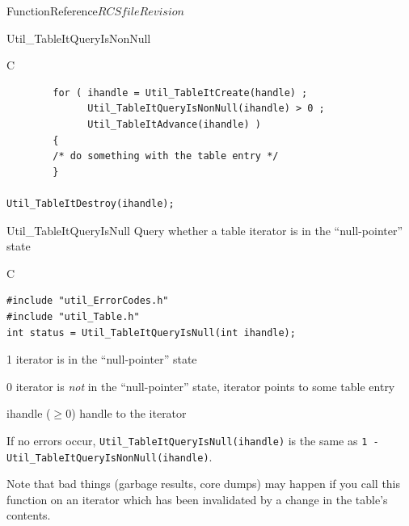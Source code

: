 \begin{cactuspart}{FunctionReference}{$RCSfile$}{$Revision$}
\begin{FunctionDescription}{Util\_TableItQueryIsNonNull}
\begin{ExampleSection}
\begin{Example}{C}
\begin{verbatim}
        for ( ihandle = Util_TableItCreate(handle) ;
              Util_TableItQueryIsNonNull(ihandle) > 0 ;
              Util_TableItAdvance(ihandle) )
        {
        /* do something with the table entry */
        }

Util_TableItDestroy(ihandle);
\end{verbatim}
\end{Example}
\end{ExampleSection}
\end{FunctionDescription}


\begin{FunctionDescription}{Util\_TableItQueryIsNull}
\label{Util-TableItQueryIsNull}
Query whether a table iterator is in the ``null-pointer'' state

\begin{SynopsisSection}
\begin{Synopsis}{C}
\begin{verbatim}
#include "util_ErrorCodes.h"
#include "util_Table.h"
int status = Util_TableItQueryIsNull(int ihandle);
\end{verbatim}
\end{Synopsis}
\end{SynopsisSection}

\begin{ResultSection}
\begin{Result}{\rm 1}
iterator is in the ``null-pointer'' state
\end{Result}
\begin{Result}{\rm 0}
iterator is {\em not\/} in the ``null-pointer'' state,
\ie{} iterator points to some table entry
\end{Result}
\end{ResultSection}

\begin{ParameterSection}
\begin{Parameter}{ihandle ($\ge 0$)}
handle to the iterator
\end{Parameter}
\end{ParameterSection}

\begin{Discussion}
If no errors occur,
\verb|Util_TableItQueryIsNull(ihandle)|
is the same as
\verb|1 - Util_TableItQueryIsNonNull(ihandle)|.

Note that bad things (garbage results, core dumps) may happen if
you call this function on an iterator which has been invalidated
by a change in the table's contents.
\end{Discussion}


\end{FunctionDescription}
\end{cactuspart}
